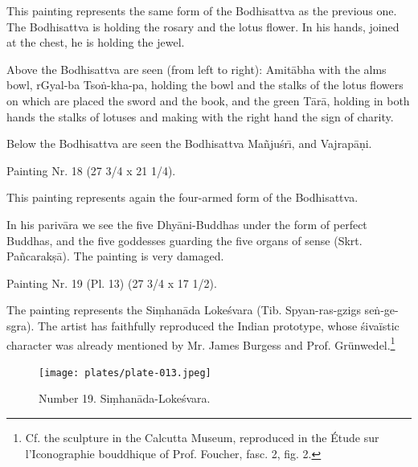 \documentclass[a4paper, 12pt, oneside]{article}
\begin{document}
This painting represents the same form of the Bodhisattva as the previous one. The Bodhisattva is holding the rosary and the lotus flower. In his hands, joined at the chest, he is holding the jewel.

Above the Bodhisattva are seen (from left to right): Amit\={a}bha with the alms bowl, rGyal-ba Tso\.{n}-kha-pa, holding the bowl and the stalks of the lotus flowers on which are placed the sword and the book, and the green T\={a}r\={a}, holding in both hands the stalks of lotuses and making with the right hand the sign of charity.

Below the Bodhisattva are seen the Bodhisattva Ma\~{n}ju\'{s}r\={\i}, and Vajrap\={a}\d{n}i.

\bigskip

Painting Nr. 18 (27 3/4 x 21 1/4).

\bigskip

This painting represents again the four-armed form of the Bodhisattva.

In his pariv\={a}ra we see the five Dhy\={a}ni-Buddhas under the form of perfect Buddhas, and the five goddesses guarding the five organs of sense (Skrt. Pa\~{n}carak\d{s}\={a}). The painting is very damaged.

\bigskip

Painting Nr. 19 (Pl. 13) (27 3/4 x 17 1/2).
 
\bigskip

The painting represents the Si\d{m}han\={a}da Loke\'{s}vara (Tib. Spyan-ras-gzigs se\.{n}-ge-sgra). The artist has faithfully reproduced the Indian prototype, whose \'{s}ivaïstic character was already mentioned by Mr. James Burgess and Prof. Grünwedel.\footnote{Cf. the sculpture in the Calcutta Museum, reproduced in the Étude sur l'Iconographie bouddhique of Prof. Foucher, fasc. 2, fig. 2.}

\clearpage
\vspace*{\fill}
\begin{figure}[H]
\centering
\texttt{[image: plates/plate-013.jpeg]}
\caption*{Number 19. Si\d{m}han\={a}da-Loke\'{s}vara.}
\end{figure}
\vspace*{\fill}
\clearpage
\end{document}
